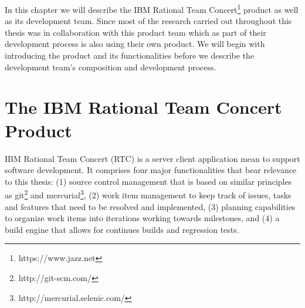 \label{chap:rtc}
In this chapter we will describe the IBM Rational Team Concert\footnote{https://www.jazz.net} product as well as its development team.
Since most of the research carried out throughout this thesis was in collaboration with this product team which as part of their development process is also using their own product.
We will begin with introducing the product and its functionalities before we describe the development team's composition and development process.

\section{The IBM Rational Team Concert Product}
IBM Rational Team Concert (RTC) is a server client application mean to support software development.
It comprises four major functionalities that bear relevance to this thesis:
(1) source control management that is based on similar principles as git\footnote{http://git-scm.com/} and mercurial\footnote{http://mercurial.selenic.com/}, (2) work item management to keep track of issues, tasks and features that need to be resolved and implemented, (3) planning capabilities to organize work items into iterations working towards milestones, and (4) a build engine that allows for continues builds and regression tests.

